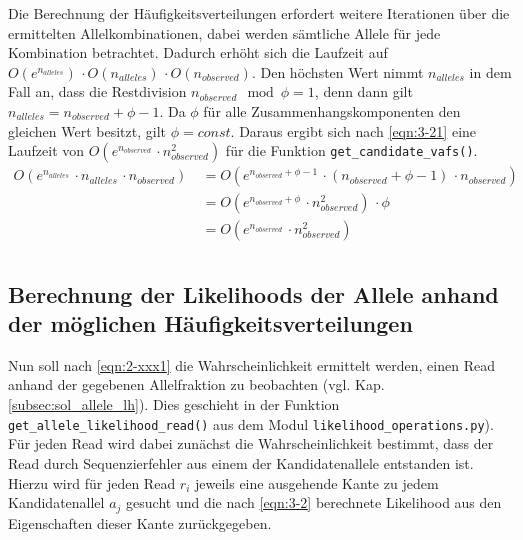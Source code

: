 Die Berechnung der Häufigkeitsverteilungen erfordert weitere Iterationen über die ermittelten Allelkombinationen, dabei werden sämtliche Allele für jede Kombination betrachtet. Dadurch erhöht sich die Laufzeit auf $ O(e^{n_{alleles}})\, \cdotp O(n_{alleles}) \, \cdotp O(n_{observed}) $. Den höchsten Wert nimmt $ n_{alleles} $ in dem Fall an, dass die Restdivision $ n_{observed} \mod \phi = 1 $, denn dann gilt  $ n_{alleles} = n_{observed} + \phi - 1 $. Da $\phi$ für alle Zusammenhangskomponenten den gleichen Wert besitzt, gilt $\phi = const$. Daraus ergibt sich nach \eqref{eqn:3-21} eine Laufzeit von $ O(e^{n_{observed}}\, \cdotp n_{observed}^2) $ für die Funktion  \lstinline|get_candidate_vafs()|.
\begin{equation} \label{eqn:3-21}
\tag{3-21}
\begin{aligned}
O(e^{n_{alleles}} \, \cdotp n_{alleles} \, \cdotp n_{observed}) 
&\ {}= O(e^{n_{observed} + \phi - 1} \, \cdotp (n_{observed} + \phi - 1) \, \cdotp n_{observed})\\
&\ = O(e^{n_{observed} + \phi}\, \cdotp n_{observed}^2) \, \cdotp \phi\\
&\ = O(e^{n_{observed}}\, \cdotp n_{observed}^2)\\
\end{aligned}
\end{equation} 

\subsection{Berechnung der Likelihoods der Allele anhand der möglichen Häufigkeitsverteilungen} \label{subsec:lh_allele}

Nun soll nach \eqref{eqn:2-xxx1} die Wahrscheinlichkeit ermittelt werden, einen Read anhand der gegebenen Allelfraktion zu beobachten (vgl. Kap. \ref{subsec:sol_allele_lh}). Dies geschieht in der Funktion \lstinline|get_allele_likelihood_read()| aus dem Modul \lstinline|likelihood_operations.py|). Für jeden Read wird dabei zunächst die Wahrscheinlichkeit bestimmt, dass der Read durch Sequenzierfehler aus einem der Kandidatenallele entstanden ist. Hierzu wird für jeden Read $ r_{i} $ jeweils eine ausgehende Kante zu jedem Kandidatenallel $ a_{j} $ gesucht und die nach \eqref{eqn:3-2} berechnete Likelihood aus den Eigenschaften dieser Kante zurückgegeben.\\

